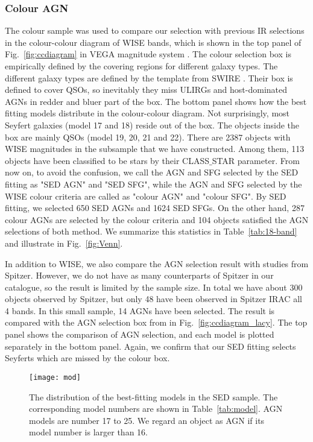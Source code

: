 \documentclass[a4paper,fleqn,usenatbib]{mnras}
\begin{document}
\subsubsection{Colour AGN}
\label{Colour AGN}    
The colour sample was used to compare our selection with previous IR selections in the colour-colour diagram of WISE bands, which is shown in the top panel of Fig.~\ref{fig:ccdiagram} in VEGA magnitude system \citep{Jarrett et al. 2011}. The colour selection box is empirically defined by the covering regions for different galaxy types. The different galaxy types are defined by the template from SWIRE \citep{Polletta et al. 2006,Polletta et al. 2007}. Their box is defined to cover QSOs, so inevitably they miss ULIRGs and host-dominated AGNs in redder and bluer part of the box. The bottom panel shows how the best fitting models distribute in the colour-colour diagram. Not surprisingly, most Seyfert galaxies (model 17 and 18) reside out of the box. The objects inside the box are mainly QSOs (model 19, 20, 21 and 22). There are 2387 objects with WISE magnitudes in the subsample that we have constructed. Among them, 113 objects have been classified to be stars by their CLASS$\_$STAR parameter. From now on, to avoid the confusion, we call the AGN and SFG selected by the SED fitting as "SED AGN" and "SED SFG", while the AGN and SFG selected by the WISE colour criteria are called as "colour AGN" and "colour SFG". By SED fitting, we selected 650 SED AGNs and 1624 SED SFGs. On the other hand, 287 colour AGNs are selected by the colour criteria and 104 objects satisfied the AGN selections of both method. We summarize this statistics in Table~\ref{tab:18-band} and illustrate in Fig.~\ref{fig:Venn}.

In addition to WISE, we also compare the AGN selection result with studies from Spitzer. However, we do not have as many counterparts of Spitzer in our catalogue, so the result is limited by the sample size. In total we have about 300 objects observed by Spitzer, but only 48 have been observed in Spitzer IRAC all 4 bands. In this small sample, 14 AGNs have been selected. The result is compared with the AGN selection box from \citet{Lacy et al. 2007} in Fig.~\ref{fig:ccdiagram_lacy}. The top panel shows the comparison of AGN selection, and each model is plotted separately in the bottom panel. Again, we confirm that our SED fitting selects Seyferts which are missed by the colour box. 



\begin{figure}
	\texttt{[image: mod]}
    \caption{The distribution of the best-fitting models in the SED sample. The corresponding model numbers are shown in Table~\ref{tab:model}. AGN models are number 17 to 25. We regard an object as AGN if its model number is larger than 16.}
    \label{fig:mod}
\end{figure}
\end{document}
